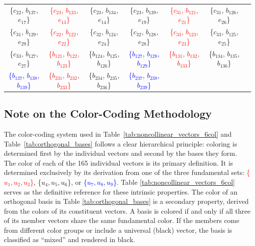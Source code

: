 \documentclass[%
  reprint,
  superscriptaddress,
  showpacs,
  showkeys,
  amsmath,amssymb,
  pra,
  longbibliography,
  floatfix,
  x11names
]{revtex4-2}
\begin{document}
\begin{table}[htbp!]
\begin{ruledtabular}
\begin{tabular}{ccccccc}
\{$c_{22}$, $b_{137}$, $e_{17}$\} & \textcolor{red}{\{$c_{23}$, $b_{133}$, $e_{13}$\}} & \{$c_{23}$, $b_{134}$, $e_{14}$\} & \{$c_{23}$, $b_{139}$, $e_{19}$\} & \textcolor{red}{\{$c_{31}$, $b_{121}$, $e_{21}$\}} & \{$c_{31}$, $b_{126}$, $e_{26}$\} \\
\{$c_{31}$, $b_{129}$, $e_{29}$\} & \textcolor{red}{\{$c_{32}$, $b_{122}$, $e_{22}$\}} & \{$c_{32}$, $b_{124}$, $e_{24}$\} & \{$c_{32}$, $b_{128}$, $e_{28}$\} & \textcolor{red}{\{$c_{33}$, $b_{123}$, $e_{23}$\}} & \{$c_{33}$, $b_{125}$, $e_{25}$\} \\
\{$c_{33}$, $b_{127}$, $e_{27}$\} & \textcolor{red}{\{$b_{121}$, $b_{122}$, $b_{123}$\}} & \textcolor{green!40!black}{\{$b_{124}$, $b_{125}$, $b_{126}$\}} & \textcolor{blue}{\{$b_{127}$, $b_{128}$, $b_{129}$\}} & \textcolor{red}{\{$b_{131}$, $b_{132}$, $b_{133}$\}} & \textcolor{green!40!black}{\{$b_{134}$, $b_{135}$, $b_{136}$\}} \\
\textcolor{blue}{\{$b_{137}$, $b_{138}$, $b_{139}$\}} & \textcolor{red}{\{$b_{231}$, $b_{232}$, $b_{233}$\}} & \textcolor{green!40!black}{\{$b_{234}$, $b_{235}$, $b_{236}$\}} & \textcolor{blue}{\{$b_{237}$, $b_{238}$, $b_{239}$\}} & & \\
\end{tabular}
\end{ruledtabular}
\end{table}

\subsection{Note on the Color-Coding Methodology}

The color-coding system used in Table~\ref{tab:noncollinear_vectors_6col} and Table~\ref{tab:orthogonal_bases}
follows a clear hierarchical principle: coloring is determined first by the individual vectors and second by the bases they form.
 The color of each of the 165 individual vectors is its primary definition. It is determined exclusively by its derivation from one of the three fundamental sets: \textcolor{red}{\{$u_1, u_2, u_3$\}}, \textcolor{green!40!black}{\{$u_4, u_5, u_6$\}}, or \textcolor{blue}{\{$u_7, u_8, u_9$\}}. Table \ref{tab:noncollinear_vectors_6col} serves as the definitive reference for these intrinsic properties.
 The color of an orthogonal basis in Table \ref{tab:orthogonal_bases} is a secondary property, derived from the colors of its constituent vectors. A basis is colored if and only if all three of its member vectors share the same fundamental color. If the members come from different color groups or include a universal (black) vector, the basis is classified as ``mixed'' and rendered in black.
\end{document}
